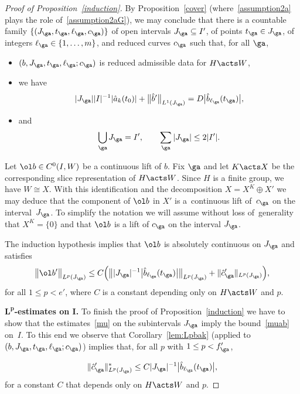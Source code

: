 \begin{proof}[Proof of Proposition~\ref{induction}]
By Proposition~\ref{cover} (where~\eqref{assumption2a} plays the role of~\eqref{assumption2aG}),
we may conclude that there is a countable family $\{(J_\ga,t_\ga,\ell_\ga,c_\ga)\}$ of open intervals $J_\ga \subseteq I'$,
of points $t_\ga \in J_\ga$,
of integers $\ell_\ga \in \{1, \dots,m\}$,
and reduced curves $c_\ga$ such that, for all $\ga$,
\begin{itemize}
	\item $(b,J_\ga,t_\ga,\ell_\ga;c_\ga)$ is reduced admissible data for $H \acts W$,
	\item we have
	\begin{gather}
 |J_\ga| |I|^{-1} {|\hat a_k(t_0)|} + \big\|\hat b'\big\|_{L^1 (J_\ga)} =
 D \big|\hat b_{\ell_\ga}(t_\ga)\big|, \label{Jba}
\end{gather}
\item and
\begin{gather}
	\bigcup_\ga J_\ga = I', \qquad \sum_\ga |J_\ga| \le 2 |I'|. \label{Jga}
\end{gather}
\end{itemize}


Let $\ol b \in C^0(I,W)$ be a continuous lift of $b$.
Fix $\ga$ and let $K \acts X$ be the corresponding slice representation of $H \acts W$.
Since $H$ is a finite group, we have $W \cong X$. With this identification and the decomposition $X = X^K \oplus X'$
we may deduce that the component of $\ol b$ in $X'$
is a~continuous lift of~$c_\ga$ on the interval~$J_\ga$.
To simplify the notation we will assume without loss of~generality that $X^{K} = \{0\}$ and that
$\ol b$ is a lift of $c_\ga$ on the interval $J_\ga$.

The induction hypothesis implies that
$\ol b$ is absolutely continuous on $J_\ga$ and satisfies
\begin{gather} \label{mu}
\big \|\ol b'\big\|_{L^p(J_\ga)} \le C \Big( \big\| |J_\ga|^{-1} {\big|\hat b_{\ell_\ga}(t_\ga)\big|} \big\|_{L^p (J_\ga)}
 + \|\hat c_{\ga}'\|_{L^p (J_\ga)}\Big),
\end{gather}
for all $1 \le p < e'$, where $C$ is a constant depending only on $H \acts W$ and $p$.


\medskip\noindent
{\bf $\boldsymbol{L^p}$-estimates on $\boldsymbol I$.}
To finish the proof of Proposition~\ref{induction} we have to show that the estimates~\eqref{mu}
on the subintervals $J_\ga$
imply the bound~\eqref{muab} on~$I$.
To this end we observe that Corollary~\ref{lem:Lpbak} (applied to $(b,J_\ga,t_\ga,\ell_\ga;c_\ga)$)
implies that,
for all $p$ with $1 \le p < f_\ga'$,
{\samepage\begin{gather} \label{eq:ctob}
 \|\hat c_{\ga}'\|^*_{L^p(J_\ga)}
 \le C |J_\ga|^{-1} \big|\hat b_{\ell_\ga} (t_\ga)\big|,
\end{gather}
for a constant $C$ that depends only on $H \acts W$ and $p$.

}
\end{proof}
